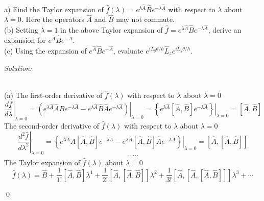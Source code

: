 \documentclass[12pt]{article}
\newenvironment{problem}[2][Problem]{\begin{trivlist}
\item[\hskip \labelsep {\bfseries #1}\hskip \labelsep {\bfseries #2.}]}{\end{trivlist}}
\newenvironment{sol}
    {\emph{Solution:}
    }
    {
    \qed
    }
\begin{document}
\begin{problem}{3}
(a) Find the Taylor expansion of $\hat{f}(\lambda)=e^{\lambda\hat{A}}\hat{B}e^{-\lambda\hat{A}}$ with respect to $\lambda$ about $\lambda=0$. Here the operators $\hat{A}$ and $\hat{B}$ may not commute.\\
(b) Setting $\lambda=1$ in the above Taylor expansion of $\hat{f}=e^{\lambda\hat{A}}\hat{B}e^{-\lambda\hat{A}}$, derive an expansion for $e^{\hat{A}}\hat{B}e^{-\hat{A}}$.\\
(c) Using the expansion of $e^{\hat{A}}\hat{B}e^{-\hat{A}}$, evaluate $e^{i\hat{L}_y\theta/\hbar}\hat{L}_ze^{i\hat{L}_y\theta/\hbar}$.
\end{problem}
\begin{sol}
\\(a) The first-order derivative of $\hat{f}(\lambda)$ with respect to $\lambda$ about $\lambda=0$
\begin{equation}
\left.\frac{df}{d\lambda}\right|_{\lambda=0}=\left.\left(e^{\lambda\hat{A}}\hat{A}\hat{B}e^{-\lambda\hat{A}}-e^{\lambda\hat{A}}\hat{B}\hat{A}e^{-\lambda\hat{A}}\right)\right|_{\lambda=0}=\left.\left\{e^{\lambda\hat{A}}[\hat{A},\hat{B}]e^{-\lambda\hat{A}}\right\}\right|_{\lambda=0}=[\hat{A},\hat{B}]
\end{equation}
The second-order derivative of $\hat{f}(\lambda)$ with respect to $\lambda$ about $\lambda=0$
\begin{equation}
\left.\frac{d^2\hat{f}}{d\lambda^2}\right|_{\lambda=0}=\left.\left\{e^{\lambda\hat{A}}\hat{A}[\hat{A},\hat{B}]e^{-\lambda\hat{A}}-e^{\lambda\hat{A}}[\hat{A},\hat{B}]\hat{A}e^{-\lambda\hat{A}}\right\}\right|_{\lambda=0}=[\hat{A},[\hat{A},\hat{B}]]
\end{equation}
\[
\cdots\cdots
\]
The Taylor expansion of $\hat{f}(\lambda)$ about $\lambda=0$
\begin{equation}
\hat{f}(\lambda)=\hat{B}+\frac{1}{1!}[\hat{A},\hat{B}]\lambda^1+\frac{1}{2!}[\hat{A},[\hat{A},\hat{B}]]\lambda^2+\frac{1}{3!}[\hat{A},[\hat{A},[\hat{A},\hat{B}]]]\lambda^3+\cdots

\end{equation}
\end{sol}
\end{document}
